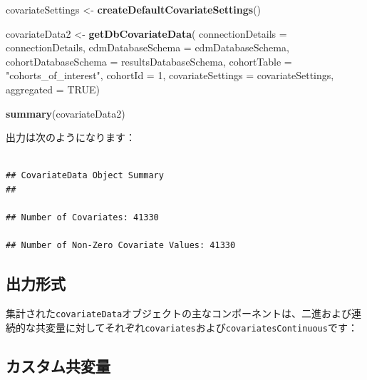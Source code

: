 \documentclass[
  11pt]{book}
\newenvironment{Shaded}{\begin{snugshade}}{\end{snugshade}}
\newcommand{\AttributeTok}[1]{\textcolor[rgb]{0.13,0.29,0.53}{#1}}
\newcommand{\ConstantTok}[1]{\textcolor[rgb]{0.56,0.35,0.01}{#1}}
\newcommand{\DecValTok}[1]{\textcolor[rgb]{0.00,0.00,0.81}{#1}}
\newcommand{\FunctionTok}[1]{\textcolor[rgb]{0.13,0.29,0.53}{\textbf{#1}}}
\newcommand{\NormalTok}[1]{#1}
\newcommand{\OtherTok}[1]{\textcolor[rgb]{0.56,0.35,0.01}{#1}}
\newcommand{\SpecialCharTok}[1]{\textcolor[rgb]{0.81,0.36,0.00}{\textbf{#1}}}
\newcommand{\StringTok}[1]{\textcolor[rgb]{0.31,0.60,0.02}{#1}}
\theoremstyle{definition}
\theoremstyle{definition}
\theoremstyle{definition}
\theoremstyle{definition}
\theoremstyle{remark}
\begin{document}
\begin{Shaded}
\begin{Highlighting}[]
\NormalTok{covariateSettings }\OtherTok{\textless{}{-}} \FunctionTok{createDefaultCovariateSettings}\NormalTok{()}

\NormalTok{covariateData2 }\OtherTok{\textless{}{-}} \FunctionTok{getDbCovariateData}\NormalTok{(}
  \AttributeTok{connectionDetails =}\NormalTok{ connectionDetails,}
  \AttributeTok{cdmDatabaseSchema =}\NormalTok{ cdmDatabaseSchema,}
  \AttributeTok{cohortDatabaseSchema =}\NormalTok{ resultsDatabaseSchema,}
  \AttributeTok{cohortTable =} \StringTok{"cohorts\_of\_interest"}\NormalTok{,}
  \AttributeTok{cohortId =} \DecValTok{1}\NormalTok{,}
  \AttributeTok{covariateSettings =}\NormalTok{ covariateSettings,}
  \AttributeTok{aggregated =} \ConstantTok{TRUE}\NormalTok{)}

\FunctionTok{summary}\NormalTok{(covariateData2)}
\end{Highlighting}
\end{Shaded}

出力は次のようになります：

\begin{verbatim}

## CovariateData Object Summary
##

## Number of Covariates: 41330

## Number of Non-Zero Covariate Values: 41330
\end{verbatim}

\subsection{出力形式}\label{ux51faux529bux5f62ux5f0f}

集計された\texttt{covariateData}オブジェクトの主なコンポーネントは、二進および連続的な共変量に対してそれぞれ\texttt{covariates}および\texttt{covariatesContinuous}です：

\begin{Shaded}
\end{Shaded}

\subsection{カスタム共変量}\label{ux30abux30b9ux30bfux30e0ux5171ux5909ux91cf}
\end{document}
